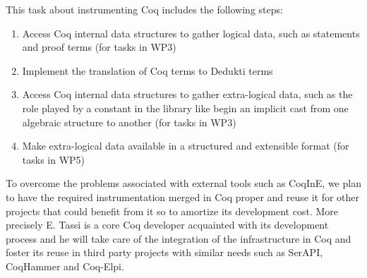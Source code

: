 


This task about instrumenting Coq includes the following steps:
\begin{enumerate}
\item Access Coq internal data structures to gather logical data, such as
statements and proof terms (for tasks in WP3)
\item Implement the translation of Coq terms to Dedukti terms
\item Access Coq internal data structures to gather extra-logical data,
such as the role played by a constant in the library like begin an implicit
cast from one algebraic structure to another (for tasks in WP3)
\item Make extra-logical data available in a structured and
  extensible format (for tasks in WP5)
\end{enumerate}

To overcome the problems associated with external tools such as
CoqInE, we plan to have the required instrumentation merged in Coq
proper and reuse it for other projects that could benefit from it so
to amortize its development cost. More precisely E. Tassi is a core
Coq developer acquainted with its development process and he will take
care of the integration of the infrastructure in Coq and foster its
reuse in third party projects with similar needs such as SerAPI,
CoqHammer and Coq-Elpi.


